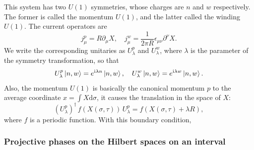 \documentclass[
]{scrartcl}
\numberwithin{equation}{section}
\theoremstyle{definition}
\theoremstyle{definition}
\theoremstyle{definition}
\theoremstyle{definition}
\theoremstyle{remark}
\begin{document}
This system has two \(U(1)\) symmetries, whose charges are \(n\) and \(w\) respectively. The former is called the momentum \(U(1)\), and the latter called the winding \(U(1)\).
The current operators are
\begin{equation}
    \label{eq:U1currents}
    j^p_\mu = R\partial_\mu X, \quad j^w_\mu = \frac{1}{2\pi R}\epsilon_{\mu\nu}\partial^\nu X.
\end{equation}
We write the corresponding unitaries as \(U^p_\lambda\) and \(U^w_\lambda\), where \(\lambda\) is the parameter of the symmetry transformation, so that
\begin{equation}
    \label{eq:UpwAct}
    U^p_\lambda \ket{n,w} = e^{\mathrm{i}\lambda n }\ket{n,w},\quad
    U^w_\lambda \ket{n,w} = e^{\mathrm{i}\lambda w }\ket{n,w}.
\end{equation}
Also, the momentum \(U(1)\) is basically the canonical momentum \(p\) to the average coordinate \(x = \int X \mathrm{d}\sigma\), it causes the translation in the space of \(X\):
\begin{equation}
    \label{eq:UpActX}
    (U^p_{\lambda})^\dagger\, f(X(\sigma,\tau)) \, U^p_{\lambda} = 
    f(X(\sigma,\tau) + \lambda R),
\end{equation}
where \(f\) is a periodic function.
With this boundary condition,

\hypertarget{projective-phases-on-the-hilbert-spaces-on-an-interval}{%
\subsubsection{Projective phases on the Hilbert spaces on an interval}\label{projective-phases-on-the-hilbert-spaces-on-an-interval}}
\end{document}
